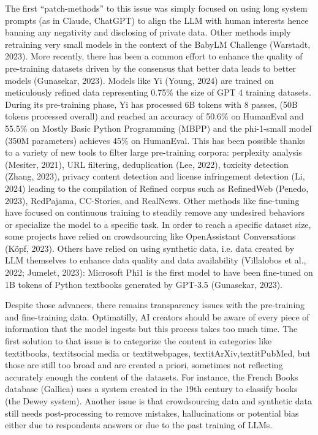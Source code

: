 \documentclass{article}
\begin{document}
The first “patch-methods” to this issue was simply focused on using long system prompts (as in Claude, ChatGPT) to align the LLM with human interests hence banning any negativity and disclosing of private data. Other methods imply retraining very small models in the context of the  BabyLM Challenge (Warstadt, 2023). More recently, there has been a common effort to enhance the quality of pre-training datasets driven by the consensus that better data leads to better models (Gunasekar, 2023). Models like Yi (Young, 2024) are trained on meticulously refined data representing 0.75\% the size of GPT 4 training datasets. During its pre-training phase, Yi has processed 6B tokens with 8 passes, (50B tokens processed overall) and reached an accuracy of 50.6\% on HumanEval and 55.5\% on Mostly Basic Python Programming (MBPP) and the phi-1-small model (350M parameters) achieves 45\% on HumanEval. This has been possible thanks to a variety of new tools to filter large pre-training corpora: perplexity analysis (Mesiter, 2021), URL filtering, deduplication (Lee, 2022), toxicity detection (Zhang, 2023), privacy content detection and license infringement detection (Li, 2024) leading to the compilation of Refined corpus such as RefinedWeb (Penedo, 2023), RedPajama, CC-Stories, and RealNews. Other methods like fine-tuning have focused on continuous training to steadily remove any undesired behaviors or specialize the model to a specific task. In order to reach a specific dataset size, some projects have relied on crowdsourcing like OpenAssistant Conversations (Köpf, 2023). Others have relied on using synthetic data, i.e. data created by LLM themselves to enhance data quality and data availability (Villalobos et al., 2022; Jumelet, 2023): Microsoft Phi1 is the first model to have been fine-tuned on 1B tokens of Python textbooks generated by GPT-3.5 (Gunasekar, 2023).

Despite those advances, there remains transparency issues with the pre-training and fine-training data. Optimatilly, AI creators should be aware of every piece of information that the model ingests but this process takes too much time. The first solution to that issue is to categorize the content in categories like textit{books}, textit{social media} or textit{webpages}, textit{ArXiv},textit{PubMed}, but those are still too broad and are created a priori, sometimes not reflecting accurately enough the content of the datasets. For instance, the French Books database (Gallica) uses a system created in the 19th century to classify books (the Dewey system). Another issue is that crowdsourcing data and synthetic data still needs post-processing to remove mistakes, hallucinations or potential bias either due to respondents answers or due to the past training of LLMs.
\end{document}
